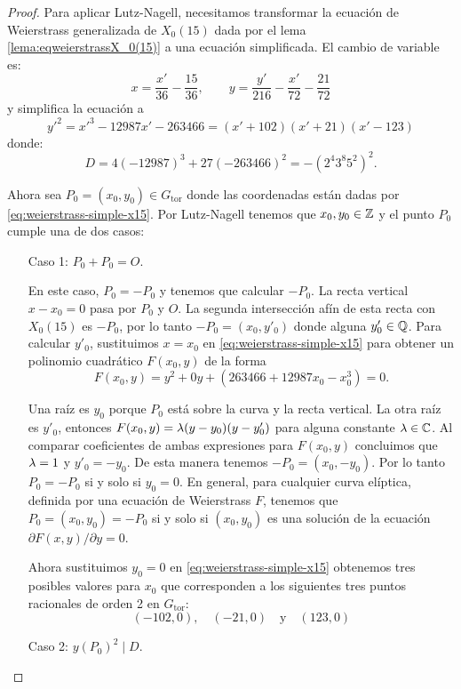 \documentclass[../../tesis_maestria]{subfiles}
\begin{document}
\begin{proof}
Para aplicar Lutz-Nagell, necesitamos transformar la ecuación de Weierstrass generalizada de $X_0(15)$ dada por el lema \ref{lema:eqweierstrassX_0(15)} a una ecuación simplificada. El cambio de variable es:
\begin{equation}\label{eq:cambio-coord-x15}
	x=\frac{x'}{36}-\frac{15}{36},\qquad y=\frac{y'}{216}-\frac{x'}{72}-\frac{21}{72}
\end{equation}
y simplifica la ecuación a
\begin{equation}\label{eq:weierstrass-simple-x15}
	y'^2=x'^3-12987x'-263466=(x'+102)(x'+21)(x'-123)
\end{equation}
donde:
\[
	D=4(-12987)^3+27(-263466)^2=-(2^4 3^8 5^2)^2.
\]

Ahora sea $P_0=(x_0,y_0)\in G_\mathrm{tor}$ donde las coordenadas están dadas por \eqref{eq:weierstrass-simple-x15}. Por Lutz-Nagell tenemos que $x_0,y_0\in\mathbb{Z}$ y el punto $P_0$ cumple una de dos casos:
\begin{enumerate}
	\item[Caso 1:] $P_0+P_0=O$.
	
	En este caso, $P_0=-P_0$ y tenemos que calcular $-P_0$. La recta vertical $x-x_0=0$ pasa por $P_0$ y $O$. La segunda intersección afín de esta recta con $X_0(15)$ es $-P_0$, por lo tanto $-P_0=(x_0,y'_0)$ donde alguna $y'_0\in\mathbb{Q}$. Para calcular $y'_0$, sustituimos $x=x_0$ en \eqref{eq:weierstrass-simple-x15} para obtener un polinomio cuadrático $F(x_0,y)$ de la forma
	\[
		F(x_0,y)=y^2+0y+(263466+12987x_0-x_0^3)=0.
	\]
	
Una raíz es $y_0$ porque $P_0$ está sobre la curva y la recta vertical. La otra raíz es $y'_0$, entonces $F(x_0,y)=\lambda(y-y_0)(y-y'_0)$ para alguna constante $\lambda\in\mathbb{C}$. Al comparar coeficientes de ambas expresiones para $F(x_0,y)$ concluimos que $\lambda=1$ y $y'_0=-y_0$. De esta manera tenemos $-P_0=(x_0,-y_0)$. Por lo tanto $P_0=-P_0$ si y solo si $y_0=0$. En general, para cualquier curva elíptica, definida por una ecuación de Weierstrass $F$, tenemos que $P_0=(x_0,y_0)=-P_0$ si y solo si $(x_0,y_0)$ es una solución de la ecuación $\partial F(x,y)/\partial y=0$.

Ahora sustituimos $y_0=0$ en \eqref{eq:weierstrass-simple-x15} obtenemos tres posibles valores para $x_0$ que corresponden a los siguientes tres puntos racionales de orden 2 en $G_\mathrm{tor}$:
\[
	(-102,0),\quad (-21,0)\quad\text{y}\quad (123,0)
\]
	\item[Caso 2:] $y(P_0)^2\mid D$.
	

\end{enumerate}
\end{proof}
\end{document}
